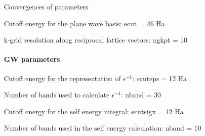 \documentclass[fontsize=9pt]{beamer}
\begin{document}
\begin{frame}{Convergences of parameters}
    

     {
        Cutoff energy for the plane wave basis: ecut = 46 Ha

        \resizebox{\linewidth}{!}{
            
        }
    }

     {
        k-grid resolution along reciprocal lattice vectors: ngkpt = 10

        \resizebox{\linewidth}{!}{
            
        }
    }

     {
        \framesubtitle{GW parameters}
    }

     {
        Cutoff energy for the representation of $\epsilon^{-1}$: ecuteps = 12 Ha

        \resizebox{\linewidth}{!}{
            
        }
    }

     {
        Number of bands used to calculate $\epsilon^{-1}$: nband = 30

        \resizebox{\linewidth}{!}{
            
        }
    }

     {
        Cutoff energy for the self energy integral: ecutsigx = 12 Ha

        \resizebox{\linewidth}{!}{
            
        }
    }

     {
        Number of bands used in the self energy calculation: nband = 10
        \resizebox{\linewidth}{!}{
            
        }
    }


\end{frame}
\end{document}

